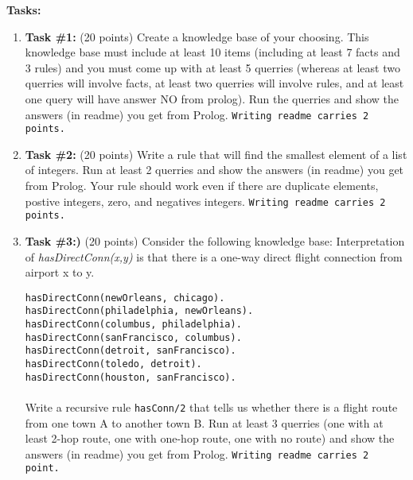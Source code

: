 \documentclass[paper=letter, fontsize=11pt]{scrartcl} %
\begin{document}
    \textbf{Tasks:}
    \begin{enumerate}

        \item \textbf{Task \#1:} (20 points) Create a knowledge base of your choosing. This knowledge base must include 
at least 10 items (including at least 7 facts and 3 rules) and you must come up with at least 5 querries (whereas at 
least two querries will involve facts, at least two querries will involve rules, and at least one query will have answer 
NO from prolog). Run the querries and show the answers (in readme) you get from Prolog. \texttt{Writing readme carries 2 points.}

       \item \textbf{Task \#2:} (20 points) Write a rule that will find the smallest element of a list of integers. 
Run at least 2 querries and show the answers (in readme) you get from Prolog. 
Your rule should work even if there are duplicate elements, postive integers, zero, and negatives integers. \texttt{Writing readme carries 2 points.}


        \item \textbf{Task \#3:)} (20 points) Consider the following knowledge base: 
Interpretation of \emph{hasDirectConn(x,y)} is that there is a one-way direct flight connection from airport x to y.
         
        \texttt{hasDirectConn(newOrleans, chicago).\\
        hasDirectConn(philadelphia, newOrleans).\\
        hasDirectConn(columbus, philadelphia).\\
        hasDirectConn(sanFrancisco, columbus).\\
        hasDirectConn(detroit, sanFrancisco).\\
        hasDirectConn(toledo, detroit).\\
        hasDirectConn(houston, sanFrancisco).\\
        } \\
        Write a recursive rule \texttt{hasConn/2} that tells us whether there is a flight route 
from one town A to another town B. Run at least 3 querries (one with at least 2-hop route, one with one-hop route, one with no route) 
and show the answers (in readme) you get from Prolog. \texttt{Writing readme carries 2 point.} 

    
    \end{enumerate}
\end{document}
